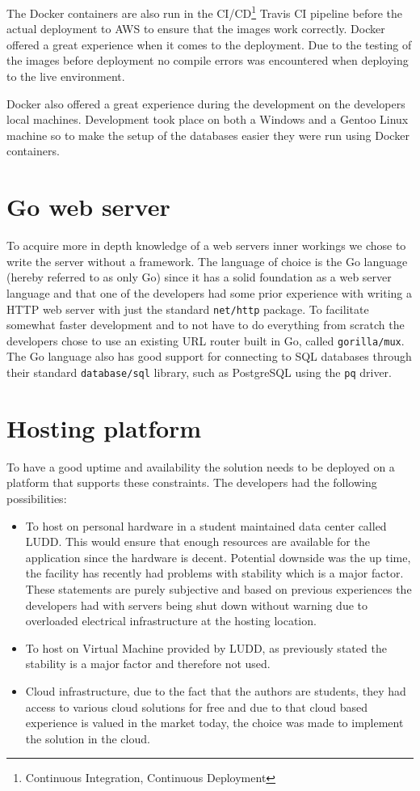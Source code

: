 \documentclass[12pt,a4paper]{report}
\begin{document}
The Docker containers are also run in the CI/CD\footnote{Continuous Integration, Continuous Deployment} Travis CI pipeline before the actual deployment to AWS to ensure that the images work correctly. Docker offered a great experience when it comes to the deployment. Due to the testing of the images before deployment no compile errors was encountered when deploying to the live environment.

Docker also offered a great experience during the development on the developers local machines. Development took place on both a Windows and a Gentoo Linux machine so to make the setup of the databases easier they were run using Docker containers.

\section{Go web server}
To acquire more in depth knowledge of a web servers inner workings we chose to write the server without a framework. The language of choice is the Go language (hereby referred to as only Go) since it has a solid foundation as a web server language and that one of the developers had some prior experience with writing a HTTP web server with just the standard \texttt{net/http} package. To facilitate somewhat faster development and to not have to do everything from scratch the developers chose to use an existing URL router built in Go, called \texttt{gorilla/mux}.
The Go language also has good support for connecting to SQL databases through their standard \texttt{database/sql} library, such as PostgreSQL using the \texttt{pq} driver\cite{go-pq-driver}.

\newpage
\section{Hosting platform}
To have a good uptime and availability the solution needs to be deployed on a platform that supports these constraints. The developers had the following possibilities:

\begin{itemize}
    \item To host on personal hardware in a student maintained data center called LUDD. This would ensure that enough resources are available for the application since the hardware is decent. Potential downside was the up time, the facility has recently had problems with stability which is a major factor. These statements are purely subjective and based on previous experiences the developers had with servers being shut down without warning due to overloaded electrical infrastructure at the hosting location.
    \item To host on Virtual Machine provided by LUDD, as previously stated the stability is a major factor and therefore not used.
    \item Cloud infrastructure, due to the fact that the authors are students, they had access to various cloud solutions for free and due to that cloud based experience is valued in the market today, the choice was made to implement the solution in the cloud.
\end{itemize}
\end{document}
